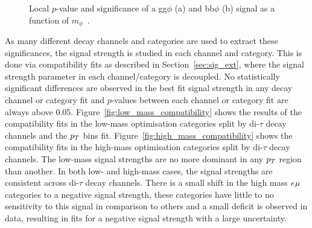 \begin{figure}[!hbtp]
\centering
\caption{Local $p$-value and significance of a gg$\phi$ (a) and bb$\phi$ (b) signal as a function of $m_{\phi}$~\cite{CMS:2022rbd}.}
\label{fig:significance}
\end{figure}

As many different decay channels and categories are used to extract these significances, the signal strength is studied in each channel and category.
This is done via compatibility fits as described in Section~\ref{sec:sig_ext}, where the signal strength parameter in each channel/category is decoupled.
No statistically significant differences are observed in the best fit signal strength in any decay channel or category fit and $p$-values between each channel or category fit are always above 0.05.
Figure~\ref{fig:low_mass_compatibility} shows the results of the compatibility fits in the low-mass optimisation categories split by di-$\tau$ decay channels and the $p_{T}$ bins fit. 
Figure~\ref{fig:high_mass_compatibility} shows the compatibility fits in the high-mass optimisation categories split by di-$\tau$ decay channels.
The low-mass signal strengths are no more dominant in any $p_{T}$ region than another.
In both low- and high-mass cases, the signal strengths are consistent across di-$\tau$ decay channels.
There is a small shift in the high mass $e_{}\mu_{}$ categories to a negative signal strength, these categories have little to no sensitivity to this signal in comparison to others and a small deficit is observed in data, resulting in fits for a negative signal strength with a large uncertainty. 


